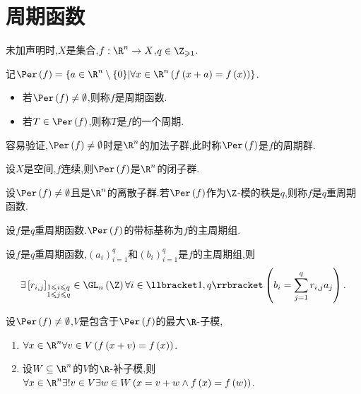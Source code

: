 \section{周期函数}

未加声明时,$X$是集合,$f:\R^{n}\to X$,$q\in\Z_{\geqslant 1}$.

\begin{definition}{}{}
	记$\Per\left(f\right)=\left\{a\in\R^{n}\setminus\left\{0\right\}\middle|\forall x\in\R^{n}\left(f\left(x+a\right)=f\left(x\right)\right)\right\}$.
	\begin{itemize}
		\item 若$\Per\left(f\right)\neq\emptyset$,则称$f$是周期函数.
		\item 若$T\in\Per\left(f\right)$,则称$T$是$f$的一个周期.
	\end{itemize}
	容易验证,$\Per\left(f\right)\neq\emptyset$时是$\R^{n}$的加法子群,此时称$\Per\left(f\right)$是$f$的周期群.
\end{definition}

\begin{proposition}{}{}
	设$X$是空间,$f$连续,则$\Per\left(f\right)$是$\R^{n}$的闭子群.
\end{proposition}

\begin{definition}{}{}
	设$\Per\left(f\right)\neq\emptyset$且是$\R^{n}$的离散子群.若$\Per\left(f\right)$作为$\Z$-模的秩是$q$,则称$f$是$q$重周期函数.
\end{definition}

\begin{definition}{}{}
	设$f$是$q$重周期函数.$\Per\left(f\right)$的带标基称为$f$的主周期组.
\end{definition}

\begin{proposition}{}{}
	设$f$是$q$重周期函数,$\left(a_{i}\right)_{i=1}^{q}$和$\left(b_{i}\right)_{i=1}^{q}$是$f$的主周期组,则
	\begin{align*}
		\exists\left[r_{i,j}\right]_{\substack{1\leqslant i\leqslant q\\1\leqslant j\leqslant q}}\in\GL_{n}\left(\Z\right)\forall i\in\llbracket 1,q\rrbracket\left(b_{i}=\sum\limits_{j=1}^{q}r_{i,j}a_{j}\right).
	\end{align*}
\end{proposition}

\begin{proposition}{}{}
	设$\Per\left(f\right)\neq\emptyset$,$V$是包含于$\Per\left(f\right)$的最大$\R$-子模,
	\begin{enumerate}
		\item $\forall x\in\R^{n}\forall v\in V\left(f\left(x+v\right)=f\left(x\right)\right)$.
		\item 设$W\subseteq\R^{n}$的$V$的$\R$-补子模,则$\forall x\in\R^{n}\exists !v\in V\exists w\in W\left(x=v+w\wedge f\left(x\right)=f\left(w\right)\right)$.
	\end{enumerate}
\end{proposition}


